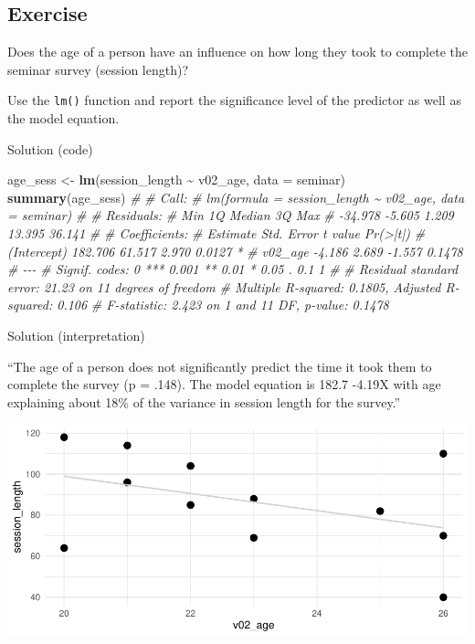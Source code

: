 \documentclass[
]{book}
\newenvironment{Shaded}{\begin{snugshade}}{\end{snugshade}}
\newcommand{\AttributeTok}[1]{\textcolor[rgb]{0.13,0.29,0.53}{#1}}
\newcommand{\CommentTok}[1]{\textcolor[rgb]{0.56,0.35,0.01}{\textit{#1}}}
\newcommand{\FunctionTok}[1]{\textcolor[rgb]{0.13,0.29,0.53}{\textbf{#1}}}
\newcommand{\NormalTok}[1]{#1}
\newcommand{\OtherTok}[1]{\textcolor[rgb]{0.56,0.35,0.01}{#1}}
\newcommand{\SpecialCharTok}[1]{\textcolor[rgb]{0.81,0.36,0.00}{\textbf{#1}}}
\begin{document}
\subsection{\texorpdfstring{Exercise }{Exercise  }}\label{exercise-7}

Does the age of a person have an influence on how long they took to complete the seminar survey (session length)?

Use the \texttt{lm()} function and report the significance level of the predictor as well as the model equation.

Solution (code)

\begin{Shaded}
\begin{Highlighting}[]
\NormalTok{age\_sess }\OtherTok{\textless{}{-}} \FunctionTok{lm}\NormalTok{(session\_length }\SpecialCharTok{\textasciitilde{}}\NormalTok{ v02\_age, }\AttributeTok{data =}\NormalTok{ seminar)}
\FunctionTok{summary}\NormalTok{(age\_sess)}
\CommentTok{\# }
\CommentTok{\# Call:}
\CommentTok{\# lm(formula = session\_length \textasciitilde{} v02\_age, data = seminar)}
\CommentTok{\# }
\CommentTok{\# Residuals:}
\CommentTok{\#     Min      1Q  Median      3Q     Max }
\CommentTok{\# {-}34.978  {-}5.605   1.209  13.395  36.141 }
\CommentTok{\# }
\CommentTok{\# Coefficients:}
\CommentTok{\#             Estimate Std. Error t value Pr(\textgreater{}|t|)  }
\CommentTok{\# (Intercept)  182.706     61.517   2.970   0.0127 *}
\CommentTok{\# v02\_age       {-}4.186      2.689  {-}1.557   0.1478  }
\CommentTok{\# {-}{-}{-}}
\CommentTok{\# Signif. codes:  0 \textquotesingle{}***\textquotesingle{} 0.001 \textquotesingle{}**\textquotesingle{} 0.01 \textquotesingle{}*\textquotesingle{} 0.05 \textquotesingle{}.\textquotesingle{} 0.1 \textquotesingle{} \textquotesingle{} 1}
\CommentTok{\# }
\CommentTok{\# Residual standard error: 21.23 on 11 degrees of freedom}
\CommentTok{\# Multiple R{-}squared:  0.1805,  Adjusted R{-}squared:  0.106 }
\CommentTok{\# F{-}statistic: 2.423 on 1 and 11 DF,  p{-}value: 0.1478}
\end{Highlighting}
\end{Shaded}

Solution (interpretation)

``The age of a person does not significantly predict the time it took them to complete the survey (p = .148). The model equation is 182.7 -4.19X with age explaining about 18\% of the variance in session length for the survey.''

\includegraphics{_main_files/figure-html/age-sess-viz-1.pdf}
\end{document}
